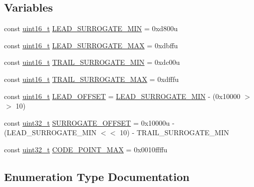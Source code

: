 \subsection*{Variables}
\begin{DoxyCompactItemize}
\item 
const \hyperlink{namespaceutf8_ac23066b92c5a1d9d9ef177201f750936}{uint16\+\_\+t} \hyperlink{namespaceutf8_1_1internal_aca9d84aa3b40e635b086c9ce843cc4a4}{L\+E\+A\+D\+\_\+\+S\+U\+R\+R\+O\+G\+A\+T\+E\+\_\+\+M\+I\+N} = 0xd800u
\item 
const \hyperlink{namespaceutf8_ac23066b92c5a1d9d9ef177201f750936}{uint16\+\_\+t} \hyperlink{namespaceutf8_1_1internal_af6038b4ebd9b71391eba050cc29720b8}{L\+E\+A\+D\+\_\+\+S\+U\+R\+R\+O\+G\+A\+T\+E\+\_\+\+M\+A\+X} = 0xdbffu
\item 
const \hyperlink{namespaceutf8_ac23066b92c5a1d9d9ef177201f750936}{uint16\+\_\+t} \hyperlink{namespaceutf8_1_1internal_a836088cf3e5e29ac9a89b2ffbd91623e}{T\+R\+A\+I\+L\+\_\+\+S\+U\+R\+R\+O\+G\+A\+T\+E\+\_\+\+M\+I\+N} = 0xdc00u
\item 
const \hyperlink{namespaceutf8_ac23066b92c5a1d9d9ef177201f750936}{uint16\+\_\+t} \hyperlink{namespaceutf8_1_1internal_a37212482f99986fc6aeaa95a9079c972}{T\+R\+A\+I\+L\+\_\+\+S\+U\+R\+R\+O\+G\+A\+T\+E\+\_\+\+M\+A\+X} = 0xdfffu
\item 
const \hyperlink{namespaceutf8_ac23066b92c5a1d9d9ef177201f750936}{uint16\+\_\+t} \hyperlink{namespaceutf8_1_1internal_a47b04bad75525ea9b01ff095c70fa081}{L\+E\+A\+D\+\_\+\+O\+F\+F\+S\+E\+T} = \hyperlink{namespaceutf8_1_1internal_aca9d84aa3b40e635b086c9ce843cc4a4}{L\+E\+A\+D\+\_\+\+S\+U\+R\+R\+O\+G\+A\+T\+E\+\_\+\+M\+I\+N} -\/ (0x10000 $>$$>$ 10)
\item 
const \hyperlink{namespaceutf8_a846259d2f173d524282583fc9d825b00}{uint32\+\_\+t} \hyperlink{namespaceutf8_1_1internal_a31ff17e602e8e7e15db5ebfb5e93a3fb}{S\+U\+R\+R\+O\+G\+A\+T\+E\+\_\+\+O\+F\+F\+S\+E\+T} = 0x10000u -\/ (\+L\+E\+A\+D\+\_\+\+S\+U\+R\+R\+O\+G\+A\+T\+E\+\_\+\+M\+I\+N $<$$<$ 10) -\/ T\+R\+A\+I\+L\+\_\+\+S\+U\+R\+R\+O\+G\+A\+T\+E\+\_\+\+M\+I\+N
\item 
const \hyperlink{namespaceutf8_a846259d2f173d524282583fc9d825b00}{uint32\+\_\+t} \hyperlink{namespaceutf8_1_1internal_a0a30055cabb6e5cefb5dafc8812cb123}{C\+O\+D\+E\+\_\+\+P\+O\+I\+N\+T\+\_\+\+M\+A\+X} = 0x0010ffffu
\end{DoxyCompactItemize}


\subsection{Enumeration Type Documentation}
\hypertarget{namespaceutf8_1_1internal_a9e96c2bc98b37e336b787a281090392c}{}
